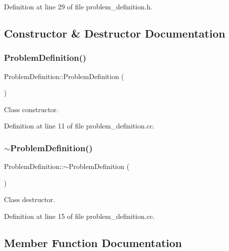 Definition at line 29 of file problem\+\_\+definition.\+h.



\subsection{Constructor \& Destructor Documentation}
\mbox{\label{class_problem_definition_ad5d05724dd7de8e362f0c8db129744f9}} 
\subsubsection{\texorpdfstring{Problem\+Definition()}{ProblemDefinition()}}
{\footnotesize\ttfamily Problem\+Definition\+::\+Problem\+Definition (\begin{DoxyParamCaption}{ }\end{DoxyParamCaption})}



Class constructor. 



Definition at line 11 of file problem\+\_\+definition.\+cc.

\mbox{\label{class_problem_definition_a6aa61be43188cf28040bd0e7d2bf02e3}} 
\subsubsection{\texorpdfstring{$\sim$\+Problem\+Definition()}{~ProblemDefinition()}}
{\footnotesize\ttfamily Problem\+Definition\+::$\sim$\+Problem\+Definition (\begin{DoxyParamCaption}{ }\end{DoxyParamCaption})}



Class destructor. 



Definition at line 15 of file problem\+\_\+definition.\+cc.



\subsection{Member Function Documentation}
\mbox{\label{class_problem_definition_a0a68b3c08b69729642dcfd37f23e7494}} 
